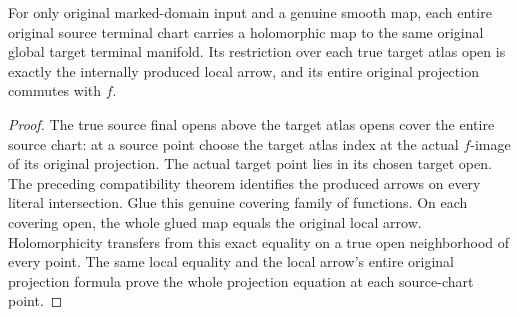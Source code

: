 \begin{theorem}
\label{hir:original-entire-source-terminal-chart-holomorphic-comparison}
\leanok
{}
For only original marked-domain input and a genuine smooth map, each entire
original source terminal chart carries a holomorphic map to the same
original global target terminal manifold. Its restriction over each true
target atlas open is exactly the internally produced local arrow, and
its entire original projection commutes with $f$.
\end{theorem}
\begin{proof}
The true source final opens above the target atlas opens cover the entire
source chart: at a source point choose the target atlas index at the actual
$f$-image of its original projection. The actual target point lies in its
chosen target open. The preceding compatibility theorem identifies the
produced arrows on every literal intersection. Glue this genuine covering
family of functions. On each covering open, the whole glued map equals
the original local arrow. Holomorphicity transfers from this exact equality
on a true open neighborhood of every point. The same local equality and
the local arrow's entire original projection formula prove the whole
projection equation at each source-chart point.
\end{proof}

